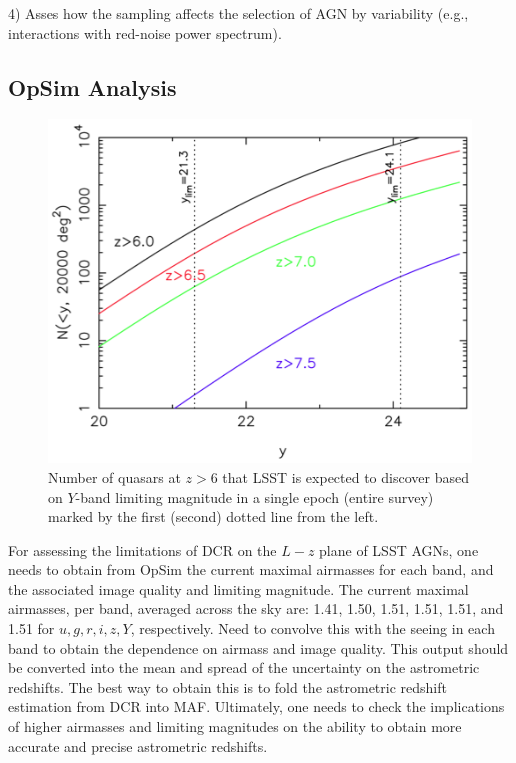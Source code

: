 4) Asses how the sampling affects the selection of AGN by variability (e.g.,
interactions with red-noise power spectrum).



\subsection{OpSim Analysis}
\label{sec:\secname:analysis}


\begin{figure}
\centering\includegraphics[width=0.9\linewidth]{figs/agn/zgt6_figure_AAS_2013.png}
\caption{Number of quasars at $z>6$ that LSST is expected to discover
based on $Y$-band limiting magnitude in a single epoch (entire survey)
marked by the first (second) dotted line from the left.}
\label{fig:zgt6}
\end{figure}


For assessing the limitations of DCR on the $L-z$ plane of LSST AGNs,
one needs to obtain from OpSim the current maximal airmasses for each band,
and the associated image quality and limiting magnitude. The current maximal
airmasses, per band, averaged across the sky are: 1.41, 1.50, 1.51, 1.51, 1.51,
and 1.51 for $u, g, r, i, z, Y$, respectively. Need to convolve this with the
seeing in each band to obtain the dependence on airmass and image
quality. This output should be converted into the mean and spread
of the uncertainty on the astrometric redshifts. The best way
to obtain this is to fold the astrometric redshift estimation from
DCR into MAF. Ultimately, one needs to check the implications of higher
airmasses and limiting magnitudes on the ability to obtain more accurate
and precise astrometric redshifts.


